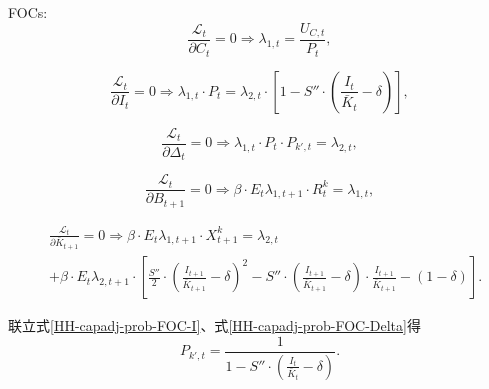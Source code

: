 \begin{subappendices}
FOCs:
\begin{equation}
\label{HH-capadj-prob-FOC-C}
\frac{\mathcal{L}_t}{\partial C_t} =0 \Rightarrow \lambda_{1,t} = \frac{U_{C,t}}{P_t},
\end{equation}

\begin{equation}
\label{HH-capadj-prob-FOC-I}
\frac{\mathcal{L}_t}{\partial I_t} =0 \Rightarrow \lambda_{1,t} \cdot P_t = \lambda_{2,t} \cdot \left[1-S''\cdot \left(\frac{I_t}{\bar{K}_t}- \delta \right)\right],
\end{equation}

\begin{equation}
\label{HH-capadj-prob-FOC-Delta}
\frac{\mathcal{L}_t}{\partial \Delta_t} =0 \Rightarrow \lambda_{1,t} \cdot P_t \cdot P_{k',t} = \lambda_{2,t},
\end{equation}

\begin{equation}
\label{HH-capadj-prob-FOC-B}
\frac{\mathcal{L}_t}{\partial B_{t+1}} =0 \Rightarrow \beta \cdot E_t \lambda_{1,t+1} \cdot R^k_t = \lambda_{1,t},
\end{equation}

\begin{align}
\label{HH-capadj-prob-FOC-barK}
&\frac{\mathcal{L}_t}{\partial \bar{K}_{t+1}} =0 \Rightarrow \beta \cdot E_{t} \lambda_{1,t+1} \cdot X^k_{t+1} = \lambda_{2,t} \nonumber \\
&+ \beta \cdot E_t \lambda_{2,t+1} \cdot \left[
\frac{S''}{2} \cdot \left(
\frac{I_{t+1}}{\bar{K}_{t+1}} - \delta
\right)^2
- S'' \cdot \left(\frac{I_{t+1}}{\bar{K}_{t+1}} - \delta\right) \cdot \frac{I_{t+1}}{\bar{K}_{t+1}}
-(1-\delta)
\right].
\end{align}

联立式\eqref{HH-capadj-prob-FOC-I}、式\eqref{HH-capadj-prob-FOC-Delta}得
\begin{equation}
\label{eq:HH-capadj-prob-FOC-pkt-q}
P_{k',t} = \frac{1}{1-S'' \cdot \left(\frac{I_t}{\bar{K}_t} - \delta\right)}.
\end{equation}


\end{subappendices}
